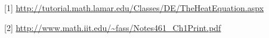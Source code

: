 \documentclass[12pt,fleqn]{article}\usepackage{../../common}
\begin{document}
[1] \url{http://tutorial.math.lamar.edu/Classes/DE/TheHeatEquation.aspx}

[2] \url{http://www.math.iit.edu/~fass/Notes461_Ch1Print.pdf}
\end{document}
